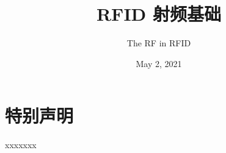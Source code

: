 \documentclass[cn,10pt,math=newtx,citestyle=gb7714-2015,bibstyle=gb7714-2015]{elegantbook}
\title{RFID 射频基础}
\subtitle{The RF in RFID}
\date{May 2, 2021}
\begin{document}
\maketitle
\frontmatter

\chapter*{特别声明}




\begin{flushright}
xxxxxxx
\end{flushright}

\tableofcontents

\mainmatter



\end{document}
